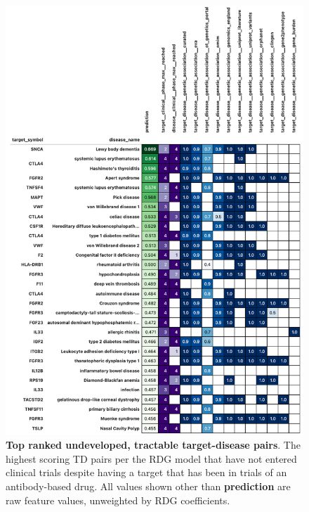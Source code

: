 \documentclass{article}
\begin{document}
\begin{figure}
  \centering
  \captionsetup{width=.9\linewidth}
  \includegraphics[width=.9\textwidth]{top_opportunity_predictions.png}
  \caption{
    \textbf{Top ranked undeveloped, tractable target-disease pairs}. The highest scoring TD pairs per the RDG model that have not entered clinical trials despite having a target that has been in trials of an antibody-based drug. All values shown other than \textbf{prediction} are raw feature values, unweighted by RDG coefficients.
  }
  \label{fig:top_opportunity_predictions}
\end{figure}
\end{document}
